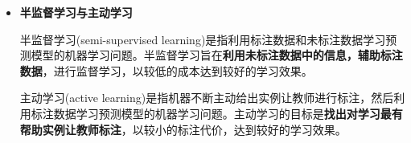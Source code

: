 \begin{itemize}
    强化学习(reinforcement learning)\footnote{强化学习不是书上重点，这里只做简单介绍}是指智能系统\textbf{在环境的连续互动中}学习最优行为策略的机器学习问题。假设智能系统与环境的互动基于马尔可夫决策过程(Markov decision process)\footnote{马尔可夫决策过程：一种交互决策过程，这里不做过多说明}，智能系统能观察到的是与环境互动得到的数据序列。强化学习的本质是学习最优的\textbf{序贯决策}。

    智能系统与环境的交互如下图，在每一步 $t$，智能系统从环境中观测到一个状态(state) $s_t$，与一个奖励(reward) $r_t$，采取一个动作(action) $a_t$。环境根据系统选择的动作，决定下一步 $s_{t+1}, r_{t+1}$。要学习的策略表示为给定状态下采取的动作。智能系统的目标不是短期奖励的最大化，二十长期累积奖励的最大化。强化学习过程中，系统不断地试错，以达到学习最优策略的目的。
    \begin{figure}[H]
        \centering
        \caption{强化学习}
    \end{figure}

    \item \textbf{半监督学习与主动学习 }

    半监督学习(semi-supervised learning)是指利用标注数据和未标注数据学习预测模型的机器学习问题。半监督学习旨在\textbf{利用未标注数据中的信息，辅助标注数据}，进行监督学习，以较低的成本达到较好的学习效果。

    主动学习(active learning)是指机器不断主动给出实例让教师进行标注，然后利用标注数据学习预测模型的机器学习问题。主动学习的目标是\textbf{找出对学习最有帮助实例让教师标注}，以较小的标注代价，达到较好的学习效果。
\end{itemize}

